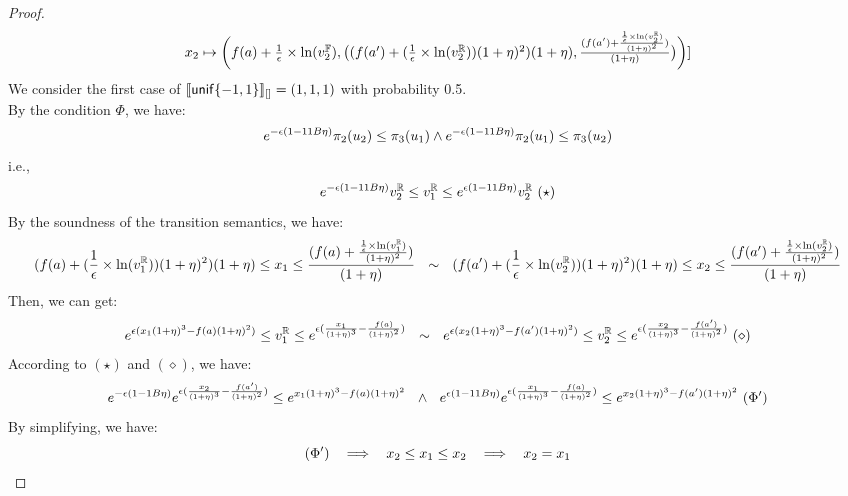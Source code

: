 \documentclass[a4paper,11pt]{article}
\begin{document}
\begin{proof}
\[\begin{array}{ll}
	 x_2 \mapsto \bigg(
				f(a) + \frac{1}{\epsilon} \times \ln(v^{\mathbb{F}}_2),
				\big( (f(a') + 
				(\frac{1}{\epsilon} \times \ln(v^{\mathbb{R}}_2))
				(1 + \eta)^2)
				{(1 + \eta)},
				\frac{(
				f(a') + \frac{\frac{1}{\epsilon} 
				\times \ln(v^{\mathbb{R}}_2)}
				{(1 + \eta)^2}
				)}
				{(1 + \eta)}
				 \big)
				\bigg)]	
	\end{array}
\]
We consider the first case of $\llbracket \mathsf{unif}\{-1, 1\} \rrbracket_{[]} = (1, 1, 1)$ with probability 0.5.
\\
By the condition $\Phi$, we have:
\[
	e^{-\epsilon(1 - 11B\eta)} \pi_2(u_2) \leq \pi_3 (u_1) 
	\land 
	e^{-\epsilon(1 - 11B\eta)} \pi_2 (u_1) \leq \pi_3 (u_2)
\]
i.e.,
\[
	e^{-\epsilon(1 - 11B\eta)} \rval_2 \leq \rval_1
	\leq e^{\epsilon(1 - 11B\eta)} \rval_2
	 ~ (\star)
\]
By the soundness of the transition semantics, we have:
\[
	(f(a) + (\frac{1}{\epsilon} \times \ln(v^{\mathbb{R}}_1))
	(1 + \eta)^2){(1 + \eta)}
	\leq x_1 \leq
	\frac{(f(a) + \frac{\frac{1}{\epsilon} 
	\times \ln(v^{\mathbb{R}}_1)}{(1 + \eta)^2})}
	{(1 + \eta)}
	~~ \sim ~~
	(f(a') + (\frac{1}{\epsilon} \times \ln(v^{\mathbb{R}}_2))
	(1 + \eta)^2){(1 + \eta)}
	\leq x_2 \leq
	\frac{(f(a') + \frac{\frac{1}{\epsilon} 
	\times \ln(v^{\mathbb{R}}_2)}
	{(1 + \eta)^2} )}{(1 + \eta)}
\]
Then, we can get:
\[
	e^{\epsilon(x_1 (1 + \eta)^3 - f(a)(1 + \eta)^2)}
	\leq v^{\mathbb{R}}_1 \leq
	e^{\epsilon(\frac{x_1}{(1 + \eta)^3}  - \frac{f(a)}{(1 + \eta)^2})}
	~~ \sim ~~
	e^{\epsilon(x_2 (1 + \eta)^3 - f(a')(1 + \eta)^2)}
	\leq v^{\mathbb{R}}_2 \leq
	e^{\epsilon(\frac{x_2}{(1 + \eta)^3}  - \frac{f(a')}{(1 + \eta)^2})} ~ (\diamond)
\]
According to $(\star)$ and $(\diamond)$, we have:
\[
		e^{-\epsilon(1 - 1B\eta)} 
		e^{\epsilon (\frac{x_2}{(1 + \eta)^3} - \frac{f(a')}{(1 + \eta)^2})}
		\leq 
		e^{x_1(1 + \eta)^3 - f(a)(1 + \eta)^2}
		~~ \land ~~
		e^{\epsilon(1 - 11B\eta)} 
		e^{\epsilon (\frac{x_1}{(1 + \eta)^3} - \frac{f(a)}{(1 + \eta)^2})}
		\leq 
		e^{x_2(1 + \eta)^3 - f(a')(1 + \eta)^2} ~ (\Phi')
\]
By simplifying, we have:
\[
	(\Phi')	
	~~ \implies ~~
	x_2 \leq x_1 \leq x_2 
	~~ \implies ~~
	x_2 = x_1
\]

\end{proof}

\newpage


\end{document}
